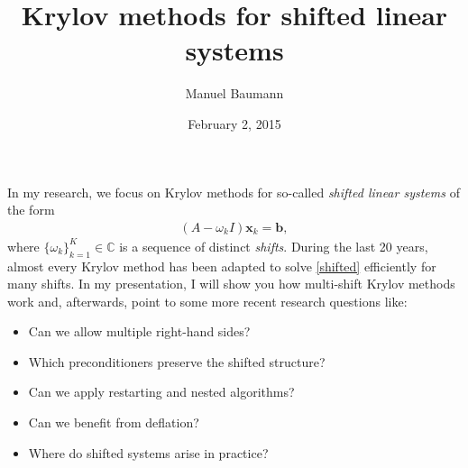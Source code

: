 \documentclass{article}
\title{Krylov methods for shifted linear systems}
\author{Manuel Baumann}
\affil{PhD student at TU Delft}
\date{February 2, 2015}
\begin{document}
\maketitle

In my research, we focus on Krylov methods for so-called \textit{shifted linear systems} of the form
\begin{align}
\label{shifted}
 (A - \omega_k I) \mathbf{x}_k = \mathbf{b},
\end{align}
where $\{\omega_k\}_{k=1}^K \in \mathbb{C}$ is a sequence of distinct \textit{shifts}. During the last 20 years, almost every Krylov method has been adapted to solve \eqref{shifted} efficiently for many shifts. In my presentation, I will show you how multi-shift Krylov methods work and, afterwards, point to some more recent research questions like:
\begin{itemize}
 \item Can we allow multiple right-hand sides?
 \item Which preconditioners preserve the shifted structure?
 \item Can we apply restarting and nested algorithms?
 \item Can we benefit from deflation?
 \item Where do shifted systems arise in practice?
\end{itemize}
\end{document}
